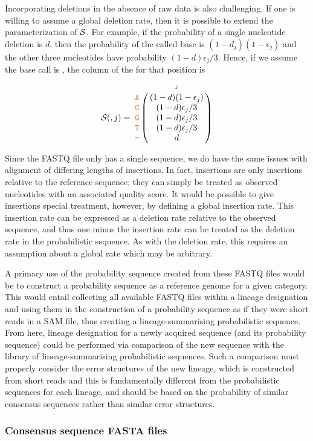 \documentclass[12pt]{article}
\begin{document}
Incorporating deletions in the absence of raw data is also challenging.
If one is willing to assume a global deletion rate, then it is possible to extend the parameterization of $\mathcal{S}$.
For example, if the probability of a single nucleotide deletion is $d$, then the probability of the called base is $(1-d_j)(1-\epsilon_j)$ and the other three nucleotides have probability $(1-d)\epsilon_j/3$.
Hence, if we assume the base call is , the column of the \nlps for that position is
\begin{equation}
\nps(,j) = 
\bordermatrix{
&\scriptscriptstyle{j}  \cr
\sq{A} & (1 - d)(1-\epsilon_j) \cr
\sq{C} & (1 - d)\epsilon_j/3 \cr
\sq{G} & (1 - d)\epsilon_j/3 \cr
\sq{T} & (1 - d)\epsilon_j/3 \cr
\sq{-} & d \cr
}
\label{eq:deletion}
\end{equation}

Since the FASTQ file only has a single sequence, we do have the same issues with alignment of differing lengths of insertions.
In fact, insertions are only insertions relative to the reference sequence; they can simply be treated as observed nucleotides with an associated quality score.
It would be possible to give insertions special treatment, however, by defining a global insertion rate.
This insertion rate can be expressed as a deletion rate relative to the observed sequence, and thus one minus the insertion rate can be treated as the deletion rate in the probabilistic sequence.
As with the deletion rate, this requires an assumption about a global rate which may be arbitrary.


A primary use of the probability sequence created from these FASTQ files would be to construct a probability sequence as a reference genome for a given category.
This would entail collecting all available FASTQ files within a lineage designation and using them in the construction of a probability sequence as if they were short reads in a SAM file, thus creating a lineage-summarising probabilistic sequence.
From here, lineage designation for a newly acquired sequence (and its probability sequence) could be performed via comparison of the new sequence with the library of lineage-summarising probabilistic sequences. 
Such a comparison must properly consider the error structures of the new lineage, which is constructed from short reads and this is fundamentally different from the probabilistic sequences for each lineage, and should be based on the probability of similar consensus sequences rather than similar error structures.

\subsubsection{Consensus sequence FASTA files}
\label{sec:consensusfasta}
\end{document}
